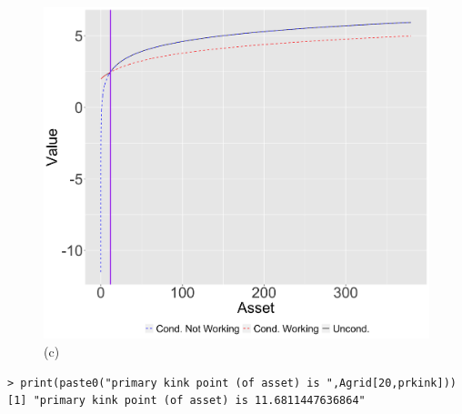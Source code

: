\documentclass[paper=a4, fontsize=13pt]{extarticle} %
\begin{document}
	\begin{figure}[H]
		\centering
	    \caption{(c)}\label{fig:valuefun}
		\includegraphics[width=0.7\linewidth]{ValueFun}
	\end{figure}
	
	\begin{lstlisting}
> print(paste0("primary kink point (of asset) is ",Agrid[20,prkink]))
[1] "primary kink point (of asset) is 11.6811447636864"
	\end{lstlisting}
	

	
\end{document}
